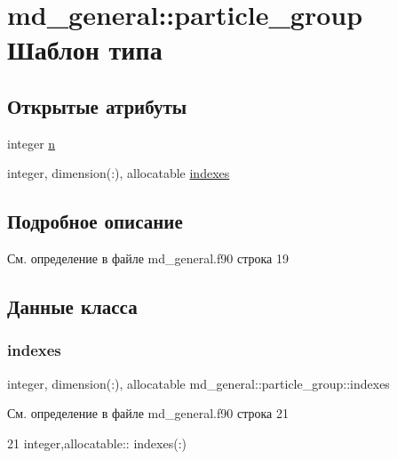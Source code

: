 \hypertarget{structmd__general_1_1particle__group}{}\section{md\+\_\+general\+:\+:particle\+\_\+group Шаблон типа}
\label{structmd__general_1_1particle__group}
\subsection*{Открытые атрибуты}
\begin{DoxyCompactItemize}
\item 
integer \mbox{\hyperlink{structmd__general_1_1particle__group_ae5ebd21f816aa601b5ab0eb7fa33637c}{n}}
\item 
integer, dimension(\+:), allocatable \mbox{\hyperlink{structmd__general_1_1particle__group_a1d2d91fc6364867b209ed20ad73b5f20}{indexes}}
\end{DoxyCompactItemize}


\subsection{Подробное описание}


См. определение в файле md\+\_\+general.\+f90 строка 19



\subsection{Данные класса}
\mbox{\label{structmd__general_1_1particle__group_a1d2d91fc6364867b209ed20ad73b5f20}} 
\subsubsection{\texorpdfstring{indexes}{indexes}}
{\footnotesize\ttfamily integer, dimension(\+:), allocatable md\+\_\+general\+::particle\+\_\+group\+::indexes}



См. определение в файле md\+\_\+general.\+f90 строка 21


\begin{DoxyCode}
21     \textcolor{keywordtype}{integer},\textcolor{keywordtype}{allocatable}:: indexes(:)
\end{DoxyCode}
\mbox{\label{structmd__general_1_1particle__group_ae5ebd21f816aa601b5ab0eb7fa33637c}} 
